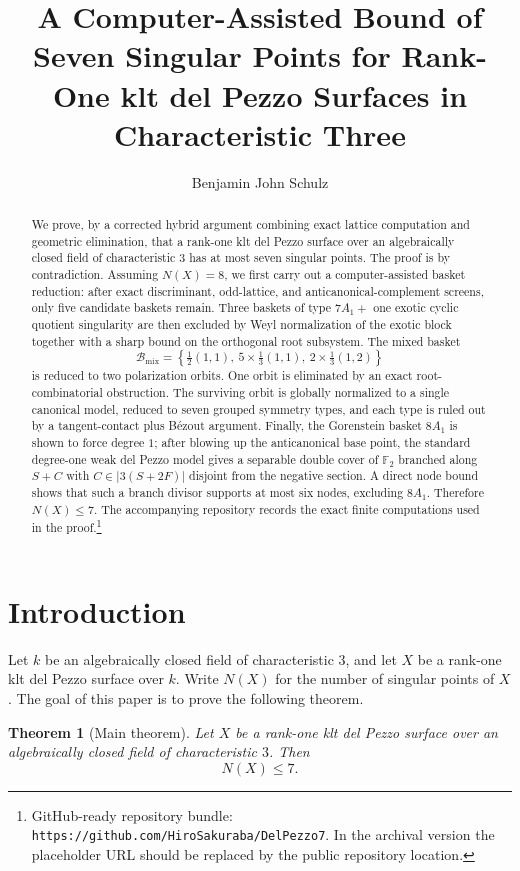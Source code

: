 \documentclass[11pt]{article}
\title{A Computer-Assisted Bound of Seven Singular Points for Rank-One klt del Pezzo Surfaces in Characteristic Three}
\author{Benjamin John Schulz}
\date{}
\newcommand{\repourl}{\texttt{https://github.com/HiroSakuraba/DelPezzo7}}
\newtheorem{theorem}{Theorem}[section]
\theoremstyle{definition}
\begin{document}
\maketitle

\begin{abstract}
We prove, by a corrected hybrid argument combining exact lattice computation and geometric elimination, that a rank-one klt del Pezzo surface over an algebraically closed field of characteristic $3$ has at most seven singular points. The proof is by contradiction. Assuming $N(X)=8$, we first carry out a computer-assisted basket reduction: after exact discriminant, odd-lattice, and anticanonical-complement screens, only five candidate baskets remain. Three baskets of type $7A_1+$ one exotic cyclic quotient singularity are then excluded by Weyl normalization of the exotic block together with a sharp bound on the orthogonal root subsystem. The mixed basket
\[
\mathcal B_{\mathrm{mix}}=\left\{\tfrac12(1,1),\ 5\times\tfrac13(1,1),\ 2\times\tfrac13(1,2)\right\}
\]
is reduced to two polarization orbits. One orbit is eliminated by an exact root-combinatorial obstruction. The surviving orbit is globally normalized to a single canonical model, reduced to seven grouped symmetry types, and each type is ruled out by a tangent-contact plus B\'ezout argument. Finally, the Gorenstein basket $8A_1$ is shown to force degree $1$; after blowing up the anticanonical base point, the standard degree-one weak del Pezzo model gives a separable double cover of $\mathbb F_2$ branched along $S+C$ with $C\in |3(S+2F)|$ disjoint from the negative section. A direct node bound shows that such a branch divisor supports at most six nodes, excluding $8A_1$. Therefore $N(X)\le 7$. The accompanying repository records the exact finite computations used in the proof.\footnote{GitHub-ready repository bundle: \repourl. In the archival version the placeholder URL should be replaced by the public repository location.}
\end{abstract}

\tableofcontents

\section{Introduction}
Let $k$ be an algebraically closed field of characteristic $3$, and let $X$ be a rank-one klt del Pezzo surface over $k$. Write $N(X)$ for the number of singular points of $X$. The goal of this paper is to prove the following theorem.

\begin{theorem}[Main theorem]\label{thm:main}
Let $X$ be a rank-one klt del Pezzo surface over an algebraically closed field of characteristic $3$. Then
\[
N(X)\le 7.
\]
\end{theorem}
\end{document}
